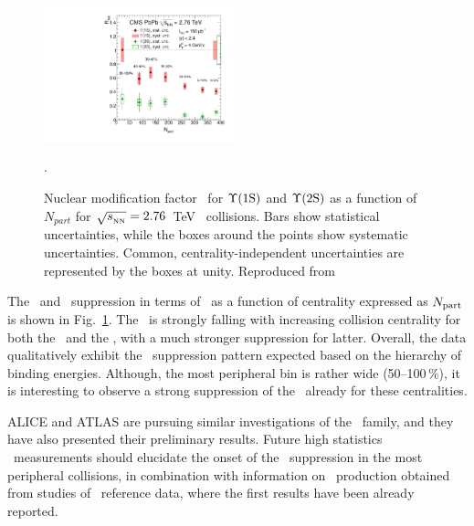 \begin{figure}[t]
\begin{center}
   \includegraphics[width=0.49\textwidth]{quarkoniafigs/RaaPt4.pdf}
   \label{fig:KS:centrality}
  \caption{
Nuclear modification factor \Raa\ for $\Upsilon\mathrm{(1S)}$ and $\Upsilon\mathrm{(2S)}$ as a function of $N_{part}$ for $\sqrt{s_{_{\rm NN}}} = 2.76$~TeV \PbPb\ collisions. Bars show statistical uncertainties, while the boxes around the points show systematic uncertainties. Common, centrality-independent uncertainties are represented by the boxes at unity. Reproduced from~\cite{Chatrchyan:2012lxa}}.
\end{center}
\end{figure}

The \PgUa\ and \PgUb\ suppression in terms of \Raa\ as a function of centrality expressed as $N_{\rm part}$
is shown in Fig.~\ref{fig:KS:centrality}.
The \Raa\ is strongly falling with increasing collision centrality
for both the \PgUa\ and the \PgUb, with a much stronger suppression for latter.
Overall, the data qualitatively exhibit the \PgUn\ suppression pattern
expected based on the hierarchy of binding energies. Although, the most peripheral bin
is rather wide (50--100\,\%), it is interesting to observe a strong suppression of the
\PgUb\ already for these centralities. 

ALICE and ATLAS are pursuing similar investigations of the \PgU\ family, and they have also presented their preliminary results.
Future high statistics \PbPb\ measurements
should elucidate the onset of the \PgU\ suppression in the most peripheral collisions,
in combination with information on \PgU\ production obtained from
studies of \pPb\ reference data, where the first results have been already reported.


